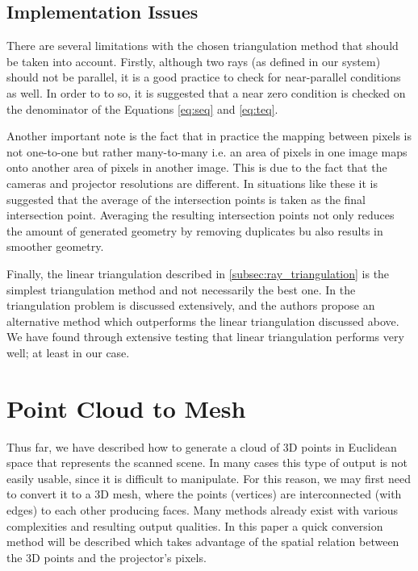 \documentclass[final,12pt,3p]{elsarticle}
\begin{document}
\subsection{Implementation Issues}
\label{subsec:discussion}
There are several limitations with the chosen triangulation method that should be taken into account. Firstly, although two rays (as defined in our system) should not be parallel, it is a good practice to check for near-parallel conditions as well. In order to to so, it is suggested that a near zero condition is checked on the denominator of the Equations \ref{eq:seq} and \ref{eq:teq}.
 
Another important note is the fact that in practice the mapping between pixels is not one-to-one but rather many-to-many i.e. an area of pixels in one image maps onto another area of pixels in another image. This is due to the fact that the cameras and projector resolutions are different. In situations like these it is suggested that the average of the intersection points is taken as the final intersection point. Averaging the resulting intersection points not only reduces the amount of generated geometry by removing duplicates bu also results in smoother geometry.

Finally, the linear triangulation described in \ref{subsec:ray_triangulation} is the simplest triangulation method and not necessarily the best one. In \cite{hartley1997triangulation} the triangulation problem is discussed extensively, and the authors propose an alternative method which outperforms the linear triangulation discussed above. We have found through extensive testing that linear triangulation performs very well; at least in our case.

\section{Point Cloud to Mesh}
\label{sec:point2Mesh}
Thus far, we have described how to generate a cloud of 3D points in Euclidean space that represents the scanned scene. In many cases this type of output is not easily usable, since it is difficult to manipulate. For this reason, we may first need to convert it to a 3D mesh, where the points (vertices) are interconnected (with edges) to each other producing faces. Many methods already exist with various complexities and resulting output qualities. In this paper a quick conversion method will be described which takes advantage of the spatial relation between the 3D points and the projector's pixels.
\end{document}

